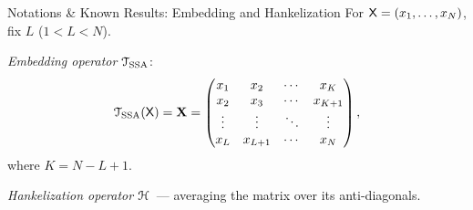 \documentclass[notheorems, handout]{beamer}
\begin{document}
\begin{frame}{Notations \& Known Results: Embedding and Hankelization}
	For $\mathsf{X}=(x_1,\ldots,x_N)$, fix $L$ ($1<L<N$).\medskip

	\emph{Embedding operator} $\EuScript{T}_\text{SSA}$:
	\begin{equation*}
		\EuScript{T}_{\text{SSA}}(\mathsf{X})=\mathbf{X}=\begin{pmatrix}
			x_1    & x_2     & \cdots & x_K     \\
			x_2    & x_3     & \cdots & x_{K+1} \\
			\vdots & \vdots  & \ddots & \vdots  \\
			x_L    & x_{L+1} & \cdots & x_N
		\end{pmatrix},
	\end{equation*}
	where $K=N-L+1$.\medskip

	\emph{Hankelization operator} $\EuScript{H}$~--- averaging the matrix over its anti-diagonals.
\end{frame}
\end{document}
